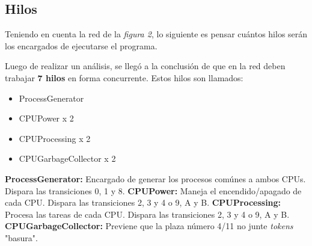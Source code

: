 \documentclass{article}
\begin{document}
    \subsection{Hilos}
    Teniendo en cuenta la red de la \emph{figura 2}, lo siguiente es pensar cuántos hilos
    serán los encargados de ejecutarse el programa. \par
    Luego de realizar un análisis, se llegó a la conclusión de que en la red deben trabajar
    \textbf{7 hilos} en forma concurrente. Estos hilos son llamados:
    \begin{itemize}
        \item ProcessGenerator
        \item CPUPower x 2
        \item CPUProcessing x 2
        \item CPUGarbageCollector x 2
    \end{itemize}
    \textbf{ProcessGenerator:} Encargado de generar los procesos comúnes a ambos CPUs. 
    Dispara las transiciones 0, 1 y 8. \newline \newline
    \textbf{CPUPower:} Maneja el encendido/apagado de cada CPU. Dispara las transiciones
    2, 3 y 4 o 9, A y B. \newline \newline
    \textbf{CPUProcessing:} Procesa las tareas de cada CPU. Dispara las transiciones
    2, 3 y 4 o 9, A y B. \newline \newline
    \textbf{CPUGarbageCollector:} Previene que la plaza número 4/11 no junte \emph{tokens}
    "basura". \newline
\end{document}

